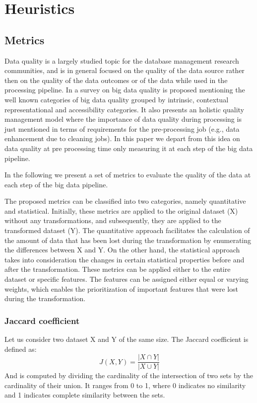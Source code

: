 \section{Heuristics}\label{sec:coalition}

\subsection{Metrics}\label{sec:metrics}

Data quality is a largely studied topic for the database management research communities,
and is in general focused on the quality of the data source rather then on the quality of the data outcomes or of the data while used in the processing pipeline.
In \cite{BigDataQaulitySurvey} a survey on big data quality is proposed mentioning the well known categories of big data quality grouped by intrinsic,
contextual representational and accessibility categories.
It also presents an holistic quality management model where the importance of data quality during processing is just mentioned in terms of requirements for the pre-processing job (e.g., data enhancement due to cleaning jobs).
In this paper we depart from this idea on data quality at pre processing time only measuring it at each step of the big data pipeline.


In the following we present a set of metrics to evaluate the quality of the data at each step of the big data pipeline.

The proposed metrics can be classified into two categories, namely quantitative and statistical.
Initially, these metrics are applied to the original dataset (X) without any transformations, and subsequently, they are applied to the transformed dataset (Y).
The quantitative approach facilitates the calculation of the amount of data that has been lost during the transformation by enumerating the differences between X and Y.
On the other hand, the statistical approach takes into consideration the changes in certain statistical properties before and after the transformation.
These metrics can be applied either to the entire dataset or specific features.
The features can be assigned either equal or varying weights, which enables the prioritization of important features that were lost during the transformation.

\subsubsection{Jaccard coefficient}
Let us consider two dataset X and Y of the same size.
The Jaccard coefficient is defined as:\[J(X,Y) = \frac{|X \cap Y|}{|X \cup Y|}\]
And is computed by dividing the cardinality of the intersection of two sets by the cardinality of their union.
It ranges from 0 to 1, where 0 indicates no similarity and 1 indicates complete similarity between the sets.

